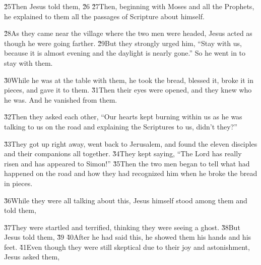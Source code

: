 \v{25}Then Jesus told them,  \v{26} \v{27}Then, beginning with Moses and all the Prophets, he explained to them all the passages of Scripture about himself.

\v{28}As they came near the village where the two men were headed, Jesus acted as though he were going farther. \v{29}But they strongly urged him, ``Stay with us, because it is almost evening and the daylight is nearly gone.'' So he went in to stay with them.

\v{30}While he was at the table with them, he took the bread, blessed it, broke it in pieces, and gave it to them. \v{31}Then their eyes were opened, and they knew who he was. And he vanished from them.

\v{32}Then they asked each other, ``Our hearts kept burning within us as he was talking to us on the road and explaining the Scriptures to us, didn't they?''

\v{33}They got up right away, went back to Jerusalem, and found the eleven disciples and their companions all together. \v{34}They kept saying, ``The Lord has really risen and has appeared to Simon!'' \v{35}Then the two men began to tell what had happened on the road and how they had recognized him when he broke the bread in pieces.

\v{36}While they were all talking about this, Jesus himself stood among them and told them, 

\v{37}They were startled and terrified, thinking they were seeing a ghost. \v{38}But Jesus told them,  \v{39} \v{40}After he had said this, he showed them his hands and his feet. \v{41}Even though they were still skeptical due to their joy and astonishment, Jesus asked them, 

